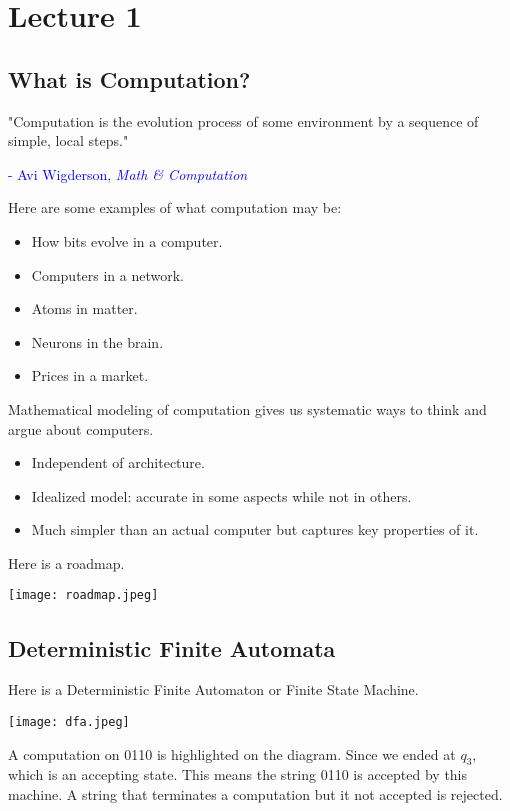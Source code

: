 \section{Lecture 1}

\subsection{What is Computation?}

"Computation is the evolution process of some environment by a sequence of simple, local steps." 

\textcolor{blue}{- Avi Wigderson, \textit{Math \& Computation}}

Here are some examples of what computation may be:
\begin{itemize}
    \item How bits evolve in a computer.
    \item Computers in a network.
    \item Atoms in matter.
    \item Neurons in the brain.
    \item Prices in a market.
\end{itemize}

\begin{note} 
    Mathematical modeling of computation gives us systematic ways to think and argue about computers.
    \begin{itemize}
        \item Independent of architecture.
        \item Idealized model: accurate in some aspects while not in others.
        \item Much simpler than an actual computer but captures key properties of it.
    \end{itemize}
\end{note}

Here is a roadmap.

\texttt{[image: roadmap.jpeg]}

\subsection{Deterministic Finite Automata}

Here is a Deterministic Finite Automaton or Finite State Machine.

\texttt{[image: dfa.jpeg]}

A computation on 0110 is highlighted on the diagram. Since we ended at $q_3$, which is an accepting state. This means the string 0110 is accepted by this machine. A string that terminates a computation but it not accepted is rejected.

